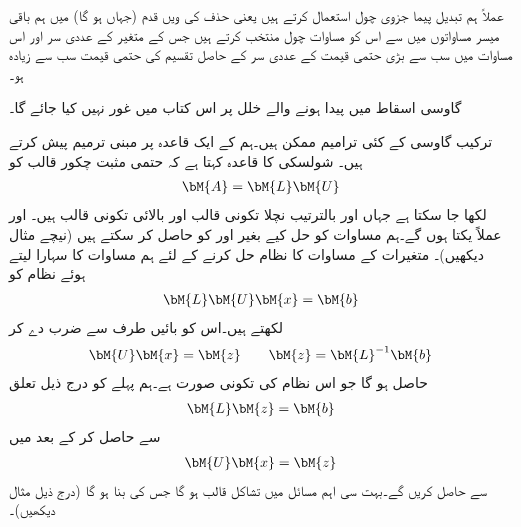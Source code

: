 عملاً ہم تبدیل پیما جزوی چول استعمال کرتے ہیں یعنی حذف کی  ویں قدم (جہاں  ہو گا) میں ہم باقی میسر  مساواتوں میں سے اس کو مساوات چول منتخب کرتے ہیں جس کے متغیر  کے عددی سر اور اس مساوات میں سب سے بڑی حتمی قیمت کے عددی سر کے حاصل تقسیم کی حتمی قیمت سب سے زیادہ ہو۔

گاوسی اسقاط میں پیدا ہونے والے خلل پر اس کتاب میں غور نہیں کیا جائے گا۔   

ترکیب گاوسی کے کئی ترامیم ممکن ہیں۔ہم  کے ایک قاعدہ پر مبنی ترمیم پیش کرتے ہیں۔ شولسکی کا قاعدہ کہتا ہے  کہ حتمی مثبت چکور قالب  کو 
\begin{align}\label{مساوات_خطی_اعدادی_شولسکی_الف}
\bM{A}=\bM{L}\bM{U}
\end{align} 
لکھا جا سکتا ہے جہاں  اور  بالترتیب نچلا تکونی قالب اور بالائی تکونی قالب ہیں۔ اور  عملاً یکتا ہوں گے۔ہم مساوات کو حل کیے بغیر  اور  کو حاصل کر سکتے ہیں (نیچے مثال دیکھیں)۔ متغیرات کے  مساوات کا نظام  حل کرنے  کے لئے ہم  مساوات  کا سہارا لیتے ہوئے  نظام کو
\begin{align*}
\bM{L}\bM{U}\bM{x}=\bM{b}
\end{align*}
لکھتے ہیں۔اس کو بائیں طرف  سے ضرب دے کر
\begin{align}\label{مساوات_خطی_اعدادی_شولسکی_ب}
\bM{U}\bM{x}=\bM{z}\quad \quad \bM{z}=\bM{L}^{-1}\bM{b}
\end{align}
حاصل ہو گا جو اس نظام کی تکونی صورت ہے۔ہم پہلے   کو درج ذیل تعلق
\begin{align}\label{مساوات_خطی_اعدادی_شولسکی_پ}
\bM{L}\bM{z}=\bM{b}
\end{align}
سے حاصل کر کے بعد میں 
\begin{align}\label{مساوات_خطی_اعدادی_شولسکی_ت}
\bM{U}\bM{x}=\bM{z}
\end{align}
سے  حاصل کریں گے۔بہت سی اہم مسائل میں  تشاکل قالب ہو گا جس کی بنا  ہو گا (درج ذیل مثال دیکھیں)۔

